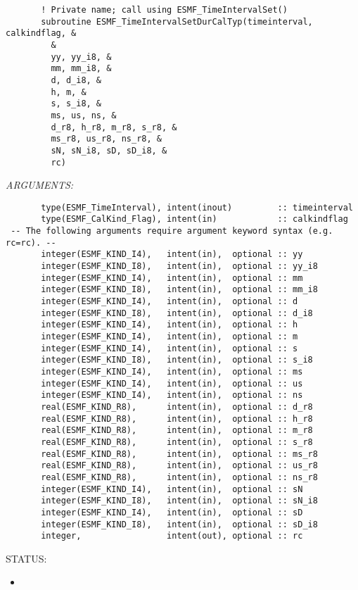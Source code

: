  
\begin{verbatim}       ! Private name; call using ESMF_TimeIntervalSet()
       subroutine ESMF_TimeIntervalSetDurCalTyp(timeinterval, calkindflag, &
         &
         yy, yy_i8, &
         mm, mm_i8, &
         d, d_i8, &
         h, m, &
         s, s_i8, &
         ms, us, ns, &
         d_r8, h_r8, m_r8, s_r8, &
         ms_r8, us_r8, ns_r8, &
         sN, sN_i8, sD, sD_i8, &
         rc)
 \end{verbatim}{\em ARGUMENTS:}
\begin{verbatim}       type(ESMF_TimeInterval), intent(inout)         :: timeinterval
       type(ESMF_CalKind_Flag), intent(in)            :: calkindflag
 -- The following arguments require argument keyword syntax (e.g. rc=rc). --
       integer(ESMF_KIND_I4),   intent(in),  optional :: yy
       integer(ESMF_KIND_I8),   intent(in),  optional :: yy_i8
       integer(ESMF_KIND_I4),   intent(in),  optional :: mm
       integer(ESMF_KIND_I8),   intent(in),  optional :: mm_i8
       integer(ESMF_KIND_I4),   intent(in),  optional :: d
       integer(ESMF_KIND_I8),   intent(in),  optional :: d_i8
       integer(ESMF_KIND_I4),   intent(in),  optional :: h
       integer(ESMF_KIND_I4),   intent(in),  optional :: m
       integer(ESMF_KIND_I4),   intent(in),  optional :: s
       integer(ESMF_KIND_I8),   intent(in),  optional :: s_i8
       integer(ESMF_KIND_I4),   intent(in),  optional :: ms
       integer(ESMF_KIND_I4),   intent(in),  optional :: us
       integer(ESMF_KIND_I4),   intent(in),  optional :: ns
       real(ESMF_KIND_R8),      intent(in),  optional :: d_r8
       real(ESMF_KIND_R8),      intent(in),  optional :: h_r8
       real(ESMF_KIND_R8),      intent(in),  optional :: m_r8
       real(ESMF_KIND_R8),      intent(in),  optional :: s_r8
       real(ESMF_KIND_R8),      intent(in),  optional :: ms_r8
       real(ESMF_KIND_R8),      intent(in),  optional :: us_r8
       real(ESMF_KIND_R8),      intent(in),  optional :: ns_r8
       integer(ESMF_KIND_I4),   intent(in),  optional :: sN
       integer(ESMF_KIND_I8),   intent(in),  optional :: sN_i8
       integer(ESMF_KIND_I4),   intent(in),  optional :: sD
       integer(ESMF_KIND_I8),   intent(in),  optional :: sD_i8
       integer,                 intent(out), optional :: rc
 \end{verbatim}
{\sf STATUS:}
   \begin{itemize}
   \item{}
   \end{itemize}
  

